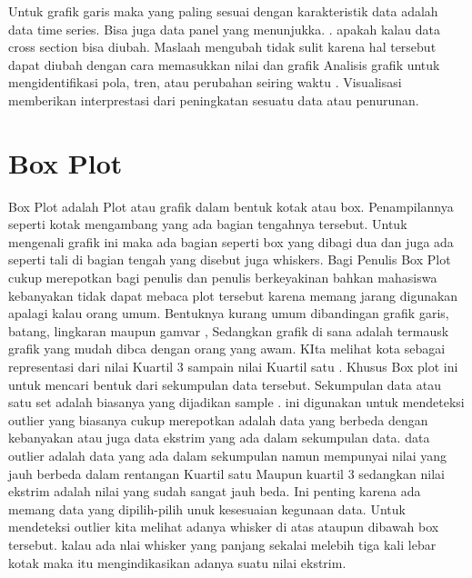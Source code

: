 \documentclass[
]{book}
\theoremstyle{definition}
\theoremstyle{definition}
\theoremstyle{definition}
\theoremstyle{definition}
\theoremstyle{remark}
\begin{document}
Untuk grafik garis maka yang paling sesuai dengan karakteristik data adalah data time series. Bisa juga data panel yang menunjukka. . apakah kalau data cross section bisa diubah. Maslaah mengubah tidak sulit karena hal tersebut dapat diubah dengan cara memasukkan nilai dan grafik
Analisis grafik untuk mengidentifikasi pola, tren, atau perubahan seiring waktu . Visualisasi memberikan interprestasi dari peningkatan sesuatu data atau penurunan.

\hypertarget{box-plot}{%
\section{Box Plot}\label{box-plot}}

Box Plot adalah Plot atau grafik dalam bentuk kotak atau box. Penampilannya seperti kotak mengambang yang ada bagian tengahnya tersebut.
Untuk mengenali grafik ini maka ada bagian seperti box yang dibagi dua dan juga ada seperti tali di bagian tengah yang disebut juga whiskers.
Bagi Penulis Box Plot cukup merepotkan bagi penulis dan penulis berkeyakinan bahkan mahasiswa kebanyakan tidak dapat mebaca plot tersebut karena memang jarang digunakan apalagi kalau orang umum. Bentuknya kurang umum dibandingan grafik garis, batang, lingkaran maupun gamvar , Sedangkan grafik di sana adalah termausk grafik yang mudah dibca dengan orang yang awam.
KIta melihat kota sebagai representasi dari nilai Kuartil 3 sampain nilai Kuartil satu . Khusus Box plot ini untuk mencari bentuk dari sekumpulan data tersebut. Sekumpulan data atau satu set adalah biasanya yang dijadikan sample . ini digunakan untuk mendeteksi outlier yang biasanya cukup merepotkan adalah data yang berbeda dengan kebanyakan atau juga data ekstrim yang ada dalam sekumpulan data. data outlier adalah data yang ada dalam sekumpulan namun mempunyai nilai yang jauh berbeda dalam rentangan Kuartil satu Maupun kuartil 3 sedangkan nilai ekstrim adalah nilai yang sudah sangat jauh beda. Ini penting karena ada memang data yang dipilih-pilih unuk kesesuaian kegunaan data.
Untuk mendeteksi outlier kita melihat adanya whisker di atas ataupun dibawah box tersebut. kalau ada nlai whisker yang panjang sekalai melebih tiga kali lebar kotak maka itu mengindikasikan adanya suatu nilai ekstrim.
\end{document}
